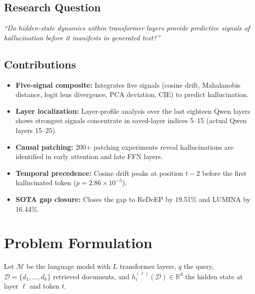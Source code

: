 \documentclass[10pt,twocolumn,a4paper]{article}
\begin{document}
\subsection{Research Question}
\textit{“Do hidden-state dynamics within transformer layers provide predictive signals of hallucination before it manifests in generated text?”}

\subsection{Contributions}
\begin{itemize}
    \item \textbf{Five-signal composite:} Integrates five signals (cosine drift, Mahalanobis distance, logit lens divergence, PCA deviation, CIE) to predict hallucination.
    \item \textbf{Layer localization:} Layer-profile analysis over the last eighteen Qwen layers shows strongest signals concentrate in saved-layer indices 5--15 (actual Qwen layers 15--25).
    \item \textbf{Causal patching:} 200+ patching experiments reveal hallucinations are identified in early attention and late FFN layers.
    \item \textbf{Temporal precedence:} Cosine drift peaks at position $t-2$ before the first hallucinated token ($p = 2.86 \times 10^{-5}$).
    \item \textbf{SOTA gap closure:} Closes the gap to ReDeEP by 19.51\% and LUMINA by 16.44\%.
\end{itemize}

\section{Problem Formulation}
Let $\mathcal{M}$ be the language model with $L$ transformer layers, $q$ the query, $\mathcal{D} = \{d_1, \dots, d_k\}$ retrieved documents, and $h_t^{(\ell)}(\mathcal{D}) \in \mathbb{R}^d$ the hidden state at layer $\ell$ and token $t$.
\end{document}
